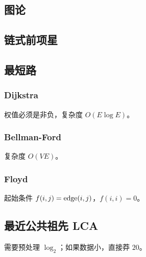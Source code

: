 \documentclass{probook}
\begin{document}
\begin{multicols}{2}
\chapter{图论}

\section{链式前项星}



\section{最短路}

\subsection{Dijkstra}

权值必须是非负，复杂度 $O(E\log E)$。



\subsection{Bellman-Ford}

复杂度 $O(VE)$。



\subsection{Floyd}

起始条件 $f(i,j)={\rm edge}(i,j)$，$f(i,i)=0$。



\section{最近公共祖先 LCA}

需要预处理 $\log_2$；如果数据小，直接莽 $20$。










\end{multicols}
\end{document}
